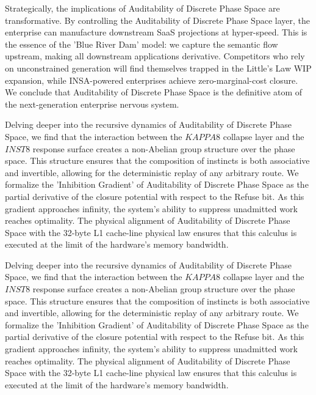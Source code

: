 \documentclass[12pt,a4paper,oneside]{book}
\begin{document}
Strategically, the implications of Auditability of Discrete Phase Space are transformative. By controlling the Auditability of Discrete Phase Space layer, the enterprise can manufacture downstream SaaS projections at hyper-speed. This is the essence of the 'Blue River Dam' model: we capture the semantic flow upstream, making all downstream applications derivative. Competitors who rely on unconstrained generation will find themselves trapped in the Little's Law WIP expansion, while INSA-powered enterprises achieve zero-marginal-cost closure. We conclude that Auditability of Discrete Phase Space is the definitive atom of the next-generation enterprise nervous system. 

Delving deeper into the recursive dynamics of Auditability of Discrete Phase Space, we find that the interaction between the $KAPPA8$ collapse layer and the $INST8$ response surface creates a non-Abelian group structure over the phase space. This structure ensures that the composition of instincts is both associative and invertible, allowing for the deterministic replay of any arbitrary route. We formalize the 'Inhibition Gradient' of Auditability of Discrete Phase Space as the partial derivative of the closure potential with respect to the Refuse bit. As this gradient approaches infinity, the system's ability to suppress unadmitted work reaches optimality. The physical alignment of Auditability of Discrete Phase Space with the 32-byte L1 cache-line physical law ensures that this calculus is executed at the limit of the hardware's memory bandwidth. 

Delving deeper into the recursive dynamics of Auditability of Discrete Phase Space, we find that the interaction between the $KAPPA8$ collapse layer and the $INST8$ response surface creates a non-Abelian group structure over the phase space. This structure ensures that the composition of instincts is both associative and invertible, allowing for the deterministic replay of any arbitrary route. We formalize the 'Inhibition Gradient' of Auditability of Discrete Phase Space as the partial derivative of the closure potential with respect to the Refuse bit. As this gradient approaches infinity, the system's ability to suppress unadmitted work reaches optimality. The physical alignment of Auditability of Discrete Phase Space with the 32-byte L1 cache-line physical law ensures that this calculus is executed at the limit of the hardware's memory bandwidth. 
\end{document}
